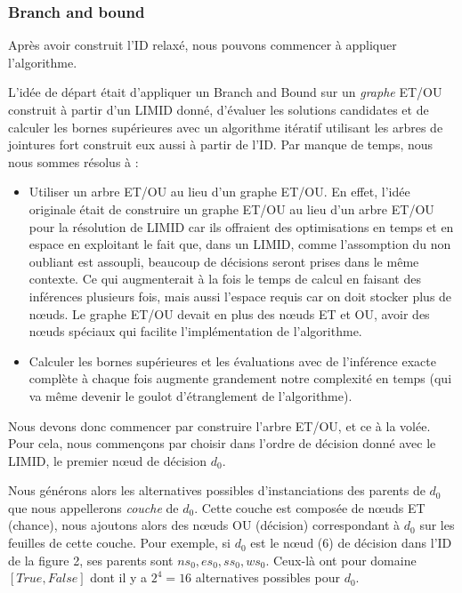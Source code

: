 \documentclass[12pt]{article}
\begin{document}
\subsubsection{Branch and bound}
Après avoir construit l'ID relaxé, nous pouvons commencer à appliquer l'algorithme. 

L'idée de départ était d'appliquer un Branch and Bound sur un \textit{graphe} ET/OU construit à partir d'un LIMID donné, d'évaluer les solutions candidates et de calculer les bornes supérieures avec un algorithme itératif utilisant les arbres de jointures fort construit eux aussi à partir de l'ID. 
\bigbreak
Par manque de temps, nous nous sommes résolus à :
\begin{itemize}
    \item Utiliser un arbre ET/OU au lieu d'un graphe ET/OU. En effet, l'idée originale était de construire un graphe ET/OU au lieu d'un arbre ET/OU pour la résolution de LIMID car ils offraient des optimisations en temps et en espace en exploitant le fait que, dans un LIMID, comme l'assomption du non oubliant est assoupli, beaucoup de décisions seront prises dans le même contexte. Ce qui augmenterait à la fois le temps de calcul en faisant des inférences plusieurs fois, mais aussi l'espace requis car on doit stocker plus de nœuds. Le graphe ET/OU devait en plus des nœuds ET et OU, avoir des nœuds spéciaux qui facilite l'implémentation de l'algorithme.
    \item Calculer les bornes supérieures et les évaluations avec de l'inférence exacte complète à chaque fois augmente grandement notre complexité en temps (qui va même devenir le goulot d'étranglement de l'algorithme).
\end{itemize}

Nous devons donc commencer par construire l'arbre ET/OU, et ce à la volée. Pour cela, nous commençons par choisir dans l'ordre de décision donné avec le LIMID, le premier nœud de décision $d_0$.

Nous générons alors les alternatives possibles d'instanciations des parents de $d_0$ que nous appellerons \textit{couche} de $d_0$. Cette couche est composée de nœuds ET (chance), nous ajoutons alors des nœuds OU (décision) correspondant à $d_0$ sur les feuilles de cette couche. Pour exemple, si $d_0$ est le nœud (6) de décision dans l'ID de la figure 2, ses parents sont $ns_0, es_0, ss_0, ws_0$. Ceux-là ont pour domaine $[True, False]$  dont il y a $2^4=16$ alternatives possibles pour $d_0$.
\end{document}
